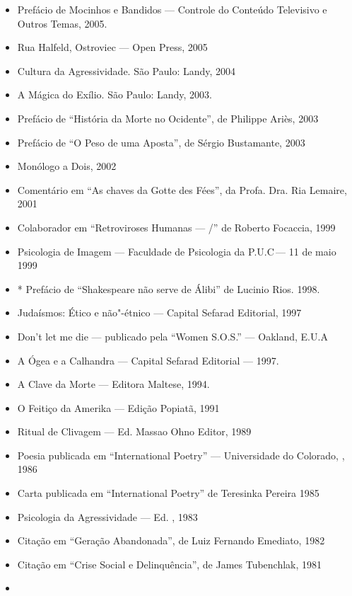 \begin{itemize}
  Poemas"-Vida --- Antologia organizada por Marília Librandí Rocha, 2008
\item
  Prefácio de Mocinhos e Bandidos --- Controle do Conteúdo Televisivo e
  Outros Temas, 2005.
\item
  Rua Halfeld, Ostroviec --- Open Press, 2005
\item
  Cultura da Agressividade. São Paulo: Landy, 2004
\item
  A Mágica do Exílio. São Paulo: Landy, 2003.
\item
  Prefácio de ``História da Morte no Ocidente'', de Philippe Ariès, 2003
\item
  Prefácio de ``O Peso de uma Aposta'', de Sérgio Bustamante, 2003
\item
  Monólogo a Dois, 2002
\item
  Comentário em ``As chaves da Gotte des Fées'', da Profa. Dra. Ria
  Lemaire, 2001
\item
  Colaborador em ``Retroviroses Humanas --- /'' de Roberto
  Focaccia, 1999
\item
  Psicologia de Imagem --- Faculdade de Psicologia da P.U.C\,--- 11 de
  maio 1999
\item
  * Prefácio de ``Shakespeare não serve de Álibi'' de Lucinio Rios.
  1998.
\item
  Judaísmos: Ético e não"-étnico --- Capital Sefarad Editorial, 1997
\item
  Don't let me die --- publicado pela ``Women S.O.S.'' --- Oakland,
  E.U.A\,\item
  A Ógea e a Calhandra --- Capital Sefarad Editorial --- 1997.
\item
  A Clave da Morte --- Editora Maltese, 1994.
\item
  O Feitiço da Amerika --- Edição Popiatã, 1991
\item
  Ritual de Clivagem --- Ed. Massao Ohno Editor, 1989
\item
  Poesia publicada em ``International Poetry'' --- Universidade do
  Colorado, , 1986
\item
  Carta publicada em ``International Poetry'' de Teresinka Pereira 1985
\item
  Psicologia da Agressividade --- Ed. , 1983
\item
  Citação em ``Geração Abandonada'', de Luiz Fernando Emediato, 1982
\item
  Citação em ``Crise Social e Delinquência'', de James Tubenchlak, 1981
\item

\end{itemize}
